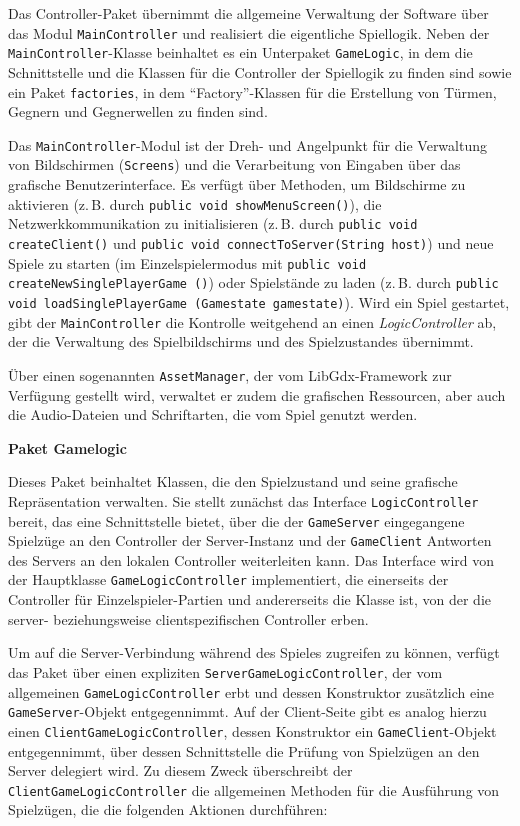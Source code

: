 \documentclass[enabledeprecatedfontcommands,fontsize=12pt,paper=a4,twoside,parskip=half]{scrartcl}
\begin{document}
Das Controller-Paket übernimmt die allgemeine Verwaltung der Software über das Modul \texttt{MainController} und realisiert die eigentliche Spiellogik. Neben der \texttt{MainController}-Klasse beinhaltet es ein Unterpaket \texttt{GameLogic}, in dem die Schnittstelle und die Klassen für die Controller der Spiellogik zu finden sind sowie ein Paket \texttt{factories}, in dem \enquote{Factory}-Klassen für die Erstellung von Türmen, Gegnern und Gegnerwellen zu finden sind. 

Das \texttt{MainController}-Modul ist der Dreh- und Angelpunkt für die Verwaltung von Bildschirmen (\texttt{Screens}) und die Verarbeitung von Eingaben über das grafische Benutzerinterface. Es verfügt über Methoden, um Bildschirme zu aktivieren (z.\,B. durch \texttt{public void showMenuScreen()}), die Netzwerkkommunikation zu initialisieren (z.\,B. durch \texttt{public void createClient()} und \texttt{public void connectToServer(String host)}) und neue Spiele zu starten (im Einzelspielermodus mit \texttt{public void createNewSinglePlayerGame ()}) oder Spielstände zu laden (z.\,B. durch \texttt{public void loadSinglePlayerGame (Gamestate gamestate)}). Wird ein Spiel gestartet, gibt der \texttt{MainController} die Kontrolle weitgehend an einen \textit{LogicController} ab, der die Verwaltung des Spielbildschirms und des Spielzustandes übernimmt.

Über einen sogenannten \texttt{AssetManager}, der vom LibGdx-Framework zur Verfügung gestellt wird, verwaltet er zudem die grafischen Ressourcen, aber auch die Audio-Dateien und Schriftarten, die vom Spiel genutzt werden. 

\textbf{Paket Gamelogic}

Dieses Paket beinhaltet Klassen, die den Spielzustand und seine grafische Repräsentation verwalten. Sie stellt zunächst das Interface \texttt{LogicController} bereit, das eine Schnittstelle bietet, über die der \texttt{GameServer} eingegangene Spielzüge an den Controller der Server-Instanz und der \texttt{GameClient} Antworten des Servers an den lokalen Controller weiterleiten kann. Das Interface wird von der Hauptklasse \texttt{GameLogicController} implementiert, die einerseits der Controller für Einzelspieler-Partien und andererseits die Klasse ist, von der die server- beziehungsweise clientspezifischen Controller erben.

Um auf die Server-Verbindung während des Spieles zugreifen zu können, verfügt das Paket über einen expliziten \texttt{ServerGameLogicController}, der vom allgemeinen \texttt{GameLogicController} erbt und dessen Konstruktor zusätzlich eine \texttt{GameServer}-Objekt entgegennimmt. Auf der Client-Seite gibt es analog hierzu einen \texttt{ClientGameLogicController}, dessen Konstruktor ein \texttt{GameClient}-Objekt entgegennimmt, über dessen Schnittstelle die Prüfung von Spielzügen an den Server delegiert wird. Zu diesem Zweck überschreibt der \texttt{ClientGameLogicController} die allgemeinen Methoden für die Ausführung von Spielzügen, die die folgenden Aktionen durchführen:
\end{document}
